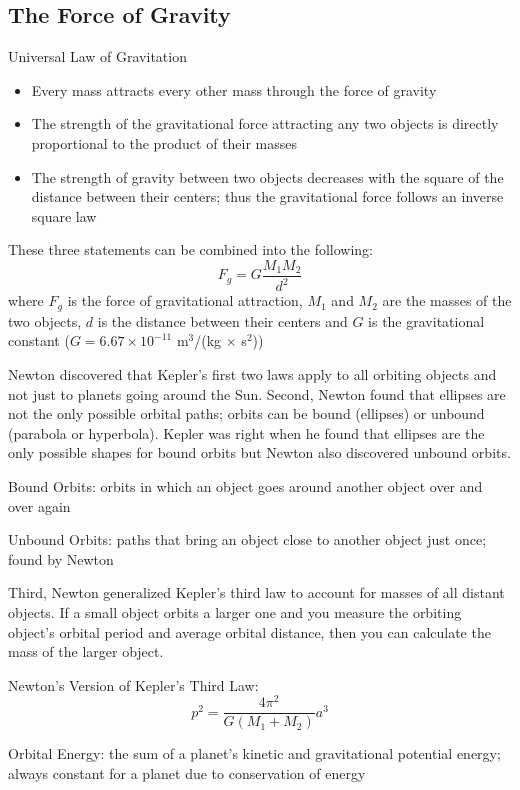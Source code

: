 \documentclass[12pt]{article}
\begin{document}
\subsection{The Force of Gravity} 
\begin{definition} Universal Law of Gravitation \begin{itemize}
\item Every mass attracts every other mass through the force of gravity 
\item The strength of the gravitational force attracting any two objects is directly proportional to the product of their masses 
\item The strength of gravity between two objects decreases with the square of the distance between their centers; thus the gravitational force follows an inverse square law \end{itemize} These three statements can be combined into the following: $$F_g = G\frac{M_1M_2}{d^2}$$ where $F_g$ is the force of gravitational attraction, $M_1$ and $M_2$ are the masses of the two objects, $d$ is the distance between their centers and $G$ is the gravitational constant ($G = 6.67 \times 10^{-11}$ m$^3$/(kg $\times$ s$^2$))
\end{definition} 
Newton discovered that Kepler's first two laws apply to all orbiting objects and not just to planets going around the Sun. Second, Newton found that ellipses are not the only possible orbital paths; orbits can be bound (ellipses) or unbound (parabola or hyperbola). Kepler was right when he found that ellipses are the only possible shapes for bound orbits but Newton also discovered unbound orbits. 
\begin{definition} Bound Orbits: orbits in which an object goes around another object over and over again \end{definition} 
\begin{definition} Unbound Orbits: paths that bring an object close to another object just once; found by Newton
\end{definition} 
Third, Newton generalized Kepler's third law to account for masses of all distant objects. If a small object orbits a larger one and you measure the orbiting object's orbital period and average orbital distance, then you can calculate the mass of the larger object. 
\begin{definition} Newton's Version of Kepler's Third Law: $$p^2 = \frac{4\pi^2}{G(M_1 + M_2)}a^3 $$ \end{definition} 
\begin{definition} Orbital Energy: the sum of a planet's kinetic and gravitational potential energy; always constant for a planet due to conservation of energy \end{definition} 
\end{document}
